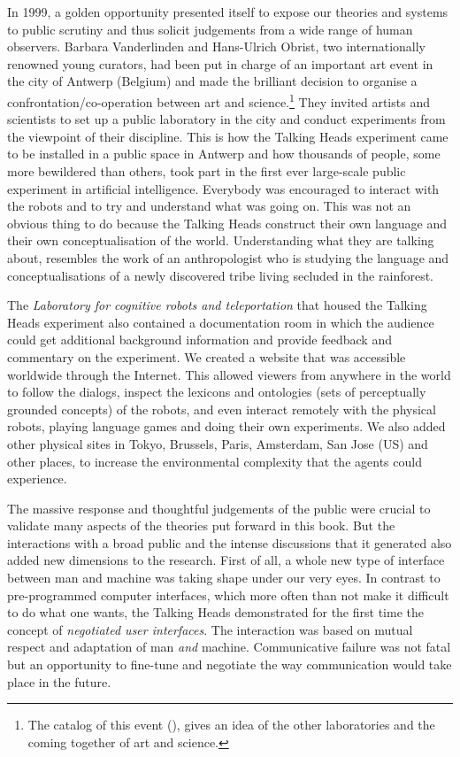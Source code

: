 In 1999, a golden opportunity presented itself to 
expose our theories and systems to public scrutiny and thus solicit
judgements from a wide range of human observers. Barbara
Vanderlinden and Hans-Ulrich Obrist, two internationally 
renowned young curators, had been put in charge of 
an important art event in the city of Antwerp (Belgium)
and made the brilliant decision to organise a 
confrontation/co-operation between art and 
science.\footnote{The catalog of this event (\cite{Obrist:1999}), gives an idea of 
the other laboratories and the coming together of art and science.}
They invited 
artists and scientists to set up 
a public laboratory in the city and conduct experiments 
from the viewpoint of their discipline. This is how 
the Talking Heads experiment came to be installed in 
a public space in Antwerp and how thousands of people, 
some more bewildered than others, took part in the first
ever large-scale public experiment in artificial intelligence. 
Everybody was encouraged to interact with the robots and 
to try and understand what was going on. This was not an obvious
thing to do because the Talking Heads
construct their own language and their own conceptualisation of 
the world. Understanding what they are talking about, resembles the work 
of an anthropologist who is studying the language and
conceptualisations of a newly discovered tribe living
secluded in the rainforest. 

The {\it Laboratory for cognitive robots and 
teleportation} that housed the 
Talking Heads experiment also contained  
a documentation room in which the audience could 
get additional background information and 
provide feedback and commentary 
on the experiment. We created a website that was accessible 
worldwide through the Internet. This allowed viewers from anywhere
in the world to follow the dialogs, inspect the lexicons
and ontologies (sets of perceptually grounded concepts) 
of the robots, and even interact remotely with the 
physical robots, playing language games 
and doing their own experiments. We also added
other physical sites in Tokyo, Brussels, Paris, Amsterdam, 
San Jose (US) and other places, to increase the environmental complexity that 
the agents could experience. 

The massive response and thoughtful judgements of the 
public were crucial to validate many aspects of the 
theories put forward in this book. 
But the interactions with a broad public and
the intense discussions that it generated also added new
dimensions to the research. First of all, a whole 
new type of interface between man and machine was
taking shape under our very eyes. In contrast to pre-programmed
computer interfaces, which more often than not make it
difficult to do what one wants, the Talking Heads demonstrated
for the first time the concept of {\itshape negotiated user
interfaces}. The interaction was based on mutual respect
and adaptation of man {\itshape and} machine. Communicative
failure was not fatal but 
an opportunity to fine-tune and negotiate the way communication
would take place in the future. 

